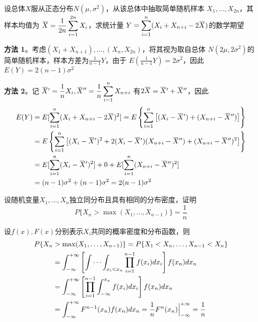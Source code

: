\documentclass{article}
\begin{document}
\begin{examplle}[]
设总体\(X\)服从正态分布\(N(\mu,\sigma^2)\)，从该总体中抽取简单随机样本
\(X_1,\dots,X_{2n}\)，其样本均值为
\(\displaystyle\bbar{X}=\frac{1}{2n}\sum_{i=1}^{2n}X_i\)，求统计量
\(Y=\displaystyle\sum_{i=1}^n(X_i+X_{n+i}-2\bbar{X})\)的数学期望

\textbf{方法 1}。考虑\((X_1+X_{n+1}),\dots,(X_n,X_{2n})\)，将其视为取自总体
\(N(2\mu,2\sigma^2)\)的简单随机样本，样本方差为\(\frac{1}{n-1}Y\)，由于
\(E(\frac{1}{n-1}Y)=2\sigma^2\)，因此\(E(Y)=2(n-1)\sigma^2\)

\textbf{方法 2}。记
\(\bbar{X}'=\displaystyle\frac{1}{n}X_i,\bbar{X}''=\frac{1}{n}\sum_{i=1}^nX_{n+i}\)
有\(2\bbar{X} =\bbar{X}'+\bbar{X}''\)，因此
\begin{align*}
E(Y)&=E[\sum_{i=1}^n(X_i+X_{n+i}-2\bbar{X})^2]=
E\left\{\sum_{i=1}^n\left[(X_i-\bbar{X}')+(X_{n+i}-\bbar{X}'')\right]\right\}\\
&=E\left\{\sum_{i=1}^n\left[(X_i-\bbar{X}')^2+2(X_i-\bbar{X}')(X_{n+i}-\bbar{X}'')+
(X_{n+i}-\bbar{X}'')^2\right]\right\}\\
&=E[\sum_{i=1}^n(X_i-\bbar{X}')^2]+0+E[\sum_{i=1}^n(X_{n+i}-\bbar{X}'')^2]\\
&=(n-1)\sigma^2+(n-1)\sigma^2=2(n-1)\sigma^2
\end{align*}
\end{examplle}

\begin{examplle}[]
设随机变量\(X_1,\dots,X_n\)独立同分布且具有相同的分布密度，证明
\begin{equation*}
P\{X_n>\max(X_1,\dots,X_{n-1})\}=\frac{1}{n}
\end{equation*}

设\(f(x),F(x)\)分别表示\(X_i\)共同的概率密度和分布函数，则
\begin{align*}
P\{X_n&>\max(X_1,\dots,X_{n-1})\}=P\{X_1<X_n,\dots,X_{n-1}<X_n\}\\
&=\int_{-\infty}^{+\infty}\left[\idotsint_{x_i<x_n}\prod_{i=1}^{n-1}f(x_i)dx_i\right]f(x_n)dx_n\\
&=\int_{-\infty}^{+\infty}\left[\prod_{i=1}^{n-1}\int_{-\infty}^{x_n}f(x_i)dx_i
\right]f(x_n)dx_n\\
&=\int_{-\infty}^{+\infty}F^{n-1}(x_n)f(x_n)dx_n=\frac{1}{n}F^n(x_n)
\Big\rvert_{-\infty}^{+\infty}=\frac{1}{n}
\end{align*}
\end{examplle}
\end{document}
